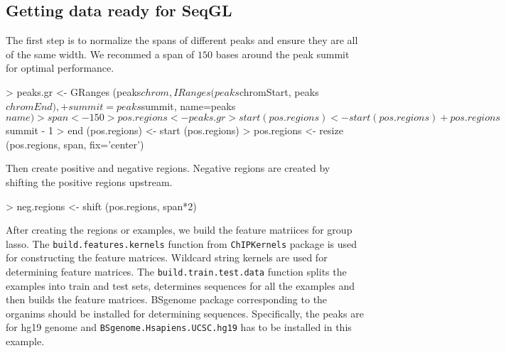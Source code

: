 \documentclass[10pt,oneside]{article}
\begin{document}
\subsection{Getting data ready for SeqGL}

The first step is to normalize the spans of different peaks and ensure they are all of the same width. We recommed a span of $150$ bases around the peak summit for optimal performance.
\begin{Schunk}
\begin{Sinput}
> peaks.gr <- GRanges (peaks$chrom, IRanges (peaks$chromStart, peaks$chromEnd),
+ 	summit=peaks$summit, name=peaks$name)
> span <- 150
> pos.regions <- peaks.gr 
> start (pos.regions) <- start (pos.regions) + pos.regions$summit - 1
> end (pos.regions) <- start (pos.regions)
> pos.regions <- resize (pos.regions, span, fix='center')
\end{Sinput}
\end{Schunk}

Then create positive and negative regions. Negative regions are created by shifting the positive regions upstream.
\begin{Schunk}
\begin{Sinput}
> neg.regions <- shift (pos.regions, span*2)
\end{Sinput}
\end{Schunk}

After creating the regions or examples, we build the feature matriices for group lasso. The \texttt{build.features.kernels} function from \texttt{ChIPKernels} package is used for constructing the feature matrices. Wildcard string kernels are used for determining feature matrices. The \texttt{build.train.test.data} function splits the examples into train and test sets, determines sequences for all the examples and then builds the feature matrices. BSgenome package corresponding to the organims should be installed for determining sequences. Specifically, the peaks are for hg19 genome and \texttt{BSgenome.Hsapiens.UCSC.hg19} has to be installed in this example.
\end{document}
